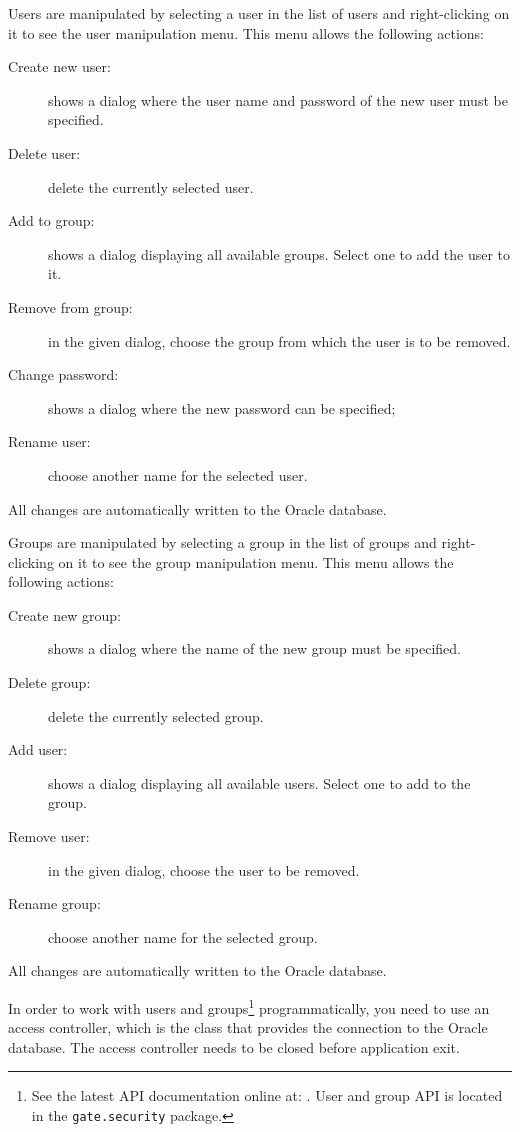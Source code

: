 Users are manipulated by selecting a user in the list of users and
right-clicking on it to see the user manipulation menu. This menu
allows the following actions:
\begin{description}
        \item[Create new user:] shows a dialog where the user name and
        password of the new user must be specified.
        \item[Delete user:] delete the currently selected user.
        \item[Add to group:] shows a dialog displaying all available
        groups. Select one to add the user to it.
        \item[Remove from group:] in the given dialog, choose the group
        from which the user is to be removed.
        \item[Change password:] shows a dialog where the new password
        can be specified;
        \item[Rename user:] choose another name for the selected user.
\end{description}

All changes are automatically written to the Oracle database.


Groups are manipulated by selecting a group in the list of groups and
right-clicking on it to see the group manipulation menu. This menu
allows the following actions:
\begin{description}
        \item[Create new group:] shows a dialog where the name of the
        new group must be specified.
        \item[Delete group:] delete the currently selected group.
        \item[Add user:] shows a dialog displaying all available
        users. Select one to add to the group.
        \item[Remove user:] in the given dialog, choose the user
        to be removed.
        \item[Rename group:] choose another name for the selected group.
\end{description}

All changes are automatically written to the Oracle database.


In order to work with users and groups\footnote{See the
latest API documentation online at: . User and group API is
located in the {\tt gate.security} package.} programmatically, you need
to use an access controller, which is the class that provides the
connection to the Oracle database. The access controller needs to be
closed before application exit.

